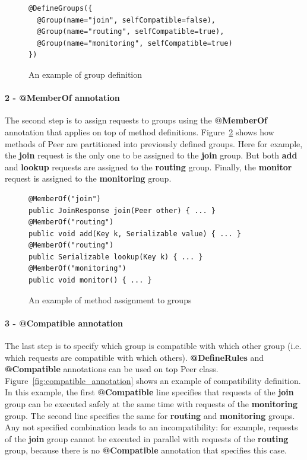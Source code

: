 \documentclass[11pt]{report}
\begin{document}
\begin{figure}[!ht]
	\lstset{language=java, numbers=left, numberstyle=\tiny, stepnumber=1, numbersep=5pt, basicstyle=\footnotesize}
	\begin{lstlisting}[frame=single]
@DefineGroups({
  @Group(name="join", selfCompatible=false),
  @Group(name="routing", selfCompatible=true),
  @Group(name="monitoring", selfCompatible=true)
})
 	\end{lstlisting}
\caption{An example of group definition}
\label{fig:group_annotation}
\end{figure}

\paragraph{2 - \textbf{@MemberOf} annotation}
The second step is to assign requests to groups using the \textbf{@MemberOf} annotation that applies on top of method definitions. Figure~\ref{fig:memberof_annotation} shows how methods of Peer are partitioned into previously defined groups. Here for example, the \textbf{join} request is the only one to be assigned to the  \textbf{join} group. But both \textbf{add} and \textbf{lookup} requests are assigned to the \textbf{routing} group. Finally, the \textbf{monitor} request is assigned to the \textbf{monitoring} group.

\begin{figure}[!ht]
	\lstset{language=java, numbers=left, numberstyle=\tiny, stepnumber=1, numbersep=5pt, basicstyle=\footnotesize}
	\begin{lstlisting}[frame=single]
@MemberOf("join")
public JoinResponse join(Peer other) { ... }
@MemberOf("routing")
public void add(Key k, Serializable value) { ... }
@MemberOf("routing")
public Serializable lookup(Key k) { ... }
@MemberOf("monitoring")
public void monitor() { ... }
 	\end{lstlisting}
\caption{An example of method assignment to groups}
\label{fig:memberof_annotation}
\end{figure}

\paragraph{3 - \textbf{@Compatible} annotation}
The last step is to specify which group is compatible with which other group (i.e. which requests are compatible with which others). \textbf{@DefineRules} and \textbf{@Compatible} annotations can be used on top Peer class. Figure~\ref{fig:compatible_annotation} shows an example of compatibility definition. In this example, the first \textbf{@Compatible} line specifies that requests of the \textbf{join} group can be executed safely at the same time with requests of the \textbf{monitoring} group. The second line specifies the same for \textbf{routing} and \textbf{monitoring} groups. Any not specified combination leads to an incompatibility: for example, requests of the \textbf{join} group cannot be executed in parallel with requests of the \textbf{routing} group, because there is no \textbf{@Compatible} annotation that specifies this case.
\end{document}
